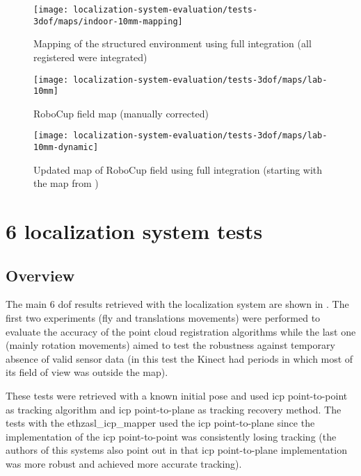 \begin{figure}[H]
	\centering
	\texttt{[image: localization-system-evaluation/tests-3dof/maps/indoor-10mm-mapping]}
	\caption{Mapping of the structured environment using full integration (all registered were integrated)}
	\label{fig:localization-system-evaluation_indoor-10mm-mapping}
\end{figure}

\begin{figure}[H]
	\centering
	\texttt{[image: localization-system-evaluation/tests-3dof/maps/lab-10mm]}
	\caption{RoboCup field map (manually corrected)}
	\label{fig:localization-system-evaluation_lab-10mm}
\end{figure}

\begin{figure}[H]
	\centering
	\texttt{[image: localization-system-evaluation/tests-3dof/maps/lab-10mm-dynamic]}
	\caption{Updated map of RoboCup field using full integration (starting with the map from )}
	\label{fig:localization-system-evaluation_lab-10mm-dynamic}
\end{figure}




\section{6  localization system tests}\label{sec:tridimensional-localization-system-tests}

\subsection{Overview}

The main 6 \gls{dof} results retrieved with the localization system are shown in . The first two experiments (fly and translations movements) were performed to evaluate the accuracy of the point cloud registration algorithms while the last one (mainly rotation movements) aimed to test the robustness against temporary absence of valid sensor data (in this test the Kinect had periods in which most of its field of view was outside the map).

These tests were retrieved with a known initial pose and used \gls{icp} point-to-point as tracking algorithm and \gls{icp} point-to-plane as tracking recovery method. The tests with the ethzasl\_icp\_mapper used the \gls{icp} point-to-plane since the implementation of the \gls{icp} point-to-point was consistently losing tracking (the authors of this systems also point out in \cite{Pomerleau2013a} that \gls{icp} point-to-plane implementation was more robust and achieved more accurate tracking).

